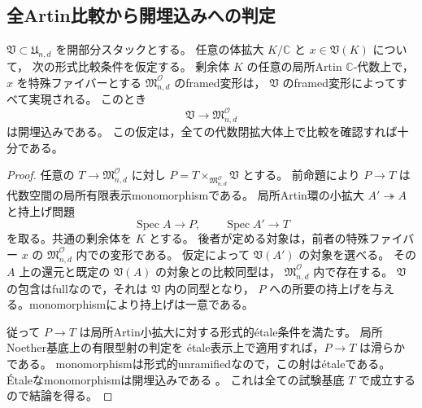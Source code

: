 \subsection{全Artin比較から開埋込みへの判定}

\begin{proposition}[形式比較が全幾何学的点で成立する場合の開性]
\label{prop:all-point-formal-comparison-open}
$\mathfrak V\subset\mathfrak U_{n,d}$ を開部分スタックとする。
任意の体拡大 $K/\mathbb C$ と $x\in\mathfrak V(K)$ について，
次の形式比較条件を仮定する。
剰余体 $K$ の任意の局所Artin $\mathbb C$-代数上で，
$x$ を特殊ファイバーとする $\mathfrak M^{\mathcal O}_{n,d}$ のframed変形は，
$\mathfrak V$ のframed変形によってすべて実現される。
このとき
\[
                 \mathfrak V\longrightarrow\mathfrak M^{\mathcal O}_{n,d}
\]
は開埋込みである。
この仮定は，全ての代数閉拡大体上で比較を確認すれば十分である。
\end{proposition}
\begin{proof}
任意の $T\to\mathfrak M^{\mathcal O}_{n,d}$ に対し
$P=T\times_{\mathfrak M^{\mathcal O}_{n,d}}\mathfrak V$ とする。
前命題により $P\to T$ は代数空間の局所有限表示monomorphismである。
局所Artin環の小拡大 $A'\twoheadrightarrow A$ と持上げ問題
\[
 \operatorname{Spec}A\longrightarrow P,
 \qquad \operatorname{Spec}A'\longrightarrow T
\]
を取る。共通の剰余体を $K$ とする。
後者が定める対象は，前者の特殊ファイバー $x$ の
$\mathfrak M^{\mathcal O}_{n,d}$ 内での変形である。
仮定によって $\mathfrak V(A')$ の対象を選べる。
その $A$ 上の還元と既定の $\mathfrak V(A)$ の対象との比較同型は，
$\mathfrak M^{\mathcal O}_{n,d}$ 内で存在する。
$\mathfrak V$ の包含はfullなので，それは $\mathfrak V$ 内の同型となり，
$P$ への所要の持上げを与える。monomorphismにより持上げは一意である。

従って $P\to T$ は局所Artin小拡大に対する形式的\'{e}tale条件を満たす。
局所Noether基底上の有限型射の判定\cite[Tag~02HY]{StacksProject}を
\'{e}tale表示上で適用すれば，$P\to T$ は滑らかである。
monomorphismは形式的unramifiedなので，この射は\'{e}taleである。
\'{E}taleなmonomorphismは開埋込みである
\cite[Tag~05W5]{StacksProject}。
これは全ての試験基底 $T$ で成立するので結論を得る。
\end{proof}

